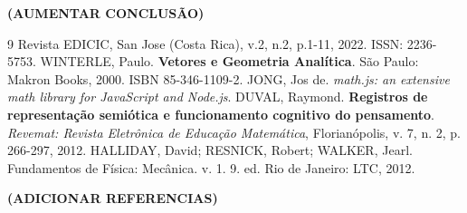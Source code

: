 \documentclass[conference,a4paper]{IEEEtran}
\begin{document}
\textbf{(AUMENTAR CONCLUSÃO)}

\begin{thebibliography}{9}
 Revista EDICIC, San Jose (Costa Rica), v.2, n.2, p.1-11, 2022. ISSN: 2236-5753.
 WINTERLE, Paulo. \textbf{Vetores e Geometria Analítica}. São Paulo: Makron Books, 2000. ISBN 85-346-1109-2.
 JONG, Jos de. \textit{math.js: an extensive math library for JavaScript and Node.js}.
 DUVAL, Raymond. \textbf{Registros de representação semiótica e funcionamento cognitivo do pensamento}. \textit{Revemat: Revista Eletrônica de Educação Matemática}, Florianópolis, v. 7, n. 2, p. 266-297, 2012.
 HALLIDAY, David; RESNICK, Robert; WALKER, Jearl. Fundamentos de Física: Mecânica. v. 1. 9. ed. Rio de Janeiro: LTC, 2012.
\end{thebibliography}

\begin{center}
\textbf{(ADICIONAR REFERENCIAS)}
\end{center}
\end{document}
